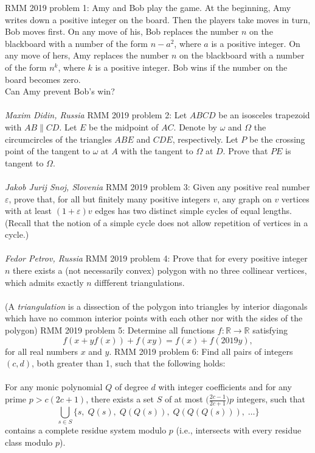 RMM 2019 problem 1:  Amy and Bob play the game. At the beginning, Amy writes down a positive integer on the board. Then the players take moves in turn, Bob moves first. On any move of his, Bob replaces the number $n$ on the blackboard with a number of the form $n-a^2$, where $a$ is a positive integer. On any move of hers, Amy replaces the number $n$ on the blackboard with a number of the form $n^k$, where $k$ is a positive integer. Bob wins if the number on the board becomes zero. \\
Can Amy prevent Bob’s win? \\\\
\textit{Maxim Didin, Russia} 
RMM 2019 problem 2:  Let $ABCD$ be an isosceles trapezoid with $AB\parallel CD$. Let $E$ be the midpoint of $AC$. Denote by $\omega$ and $\Omega$ the circumcircles of the triangles $ABE$ and $CDE$, respectively. Let $P$ be the crossing point of the tangent to $\omega$ at $A$ with the tangent to $\Omega$ at $D$. Prove that $PE$ is tangent to $\Omega$. \\\\
\textit{Jakob Jurij Snoj, Slovenia} 
RMM 2019 problem 3:  Given any positive real number $\varepsilon$, prove that, for all but finitely many positive integers $v$, any graph on $v$ vertices with at least  $(1+\varepsilon)v$ edges has two distinct simple cycles of equal lengths. \\
(Recall that the notion of a simple cycle does not allow repetition of vertices in a cycle.) \\\\
\textit{Fedor Petrov, Russia} 
RMM 2019 problem 4:  Prove that for every positive integer $n$ there exists a (not necessarily convex) polygon with no three collinear vertices, which admits exactly $n$ diffferent triangulations. \\\\
(A \textit{triangulation} is a dissection of the polygon into triangles by interior diagonals which have no common interior points with each other nor with the sides of the polygon) 
RMM 2019 problem 5:  Determine all functions $f: \mathbb{R} \to \mathbb{R}$ satisfying
\[ f(x + yf(x)) + f(xy) = f(x) + f(2019y), \]
for all real numbers $x$ and $y$. 
RMM 2019 problem 6:  Find all pairs of integers $(c, d)$, both greater than 1, such that the following holds: \\\\
For any monic polynomial $Q$ of degree $d$ with integer coefficients and for any prime $p > c(2c+1)$, there exists a set $S$ of at most $\big(\tfrac{2c-1}{2c+1}\big)p$ integers, such that
\[ \bigcup_{s \in S} \{s,\; Q(s),\; Q(Q(s)),\; Q(Q(Q(s))),\; \dots\} \]
contains a complete residue system modulo $p$ (i.e., intersects with every residue class modulo $p$). 

